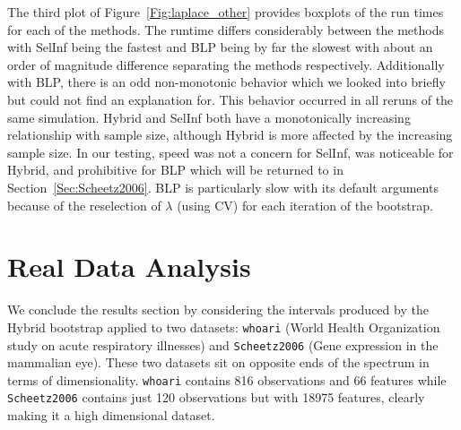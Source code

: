 The third plot of Figure~\ref{Fig:laplace_other} provides boxplots of the run times for each of the methods. The runtime differs considerably between the methods with SelInf being the fastest and BLP being by far the slowest with about an order of magnitude difference separating the methods respectively. Additionally with BLP, there is an odd non-monotonic behavior which we looked into briefly but could not find an explanation for. This behavior occurred in all reruns of the same simulation. Hybrid and SelInf both have a monotonically increasing relationship with sample size, although Hybrid is more affected by the increasing sample size. In our testing, speed was not a concern for SelInf, was noticeable for Hybrid, and prohibitive for BLP which will be returned to in Section~\ref{Sec:Scheetz2006}. BLP is particularly slow with its default arguments because of the reselection of $\lambda$ (using CV) for each iteration of the bootstrap.



\section{Real Data Analysis}\label{Sec:RDA}

We conclude the results section by considering the intervals produced by the Hybrid bootstrap applied to two datasets: \texttt{whoari} (World Health Organization study on acute respiratory illnesses) and \texttt{Scheetz2006} (Gene expression in the mammalian eye). These two datasets sit on opposite ends of the spectrum in terms of dimensionality. \texttt{whoari} contains 816 observations and 66 features while \texttt{Scheetz2006} contains just 120 observations but with 18975 features, clearly making it a high dimensional dataset.

